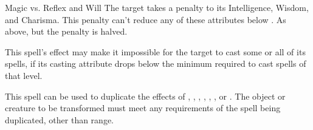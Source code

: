 \begin{spellheader}
    \begin{spelltargetinginfo}
    \end{spelltargetinginfo}
    \begin{spelleffects}
    \end{spelleffects}
\end{spellheader}
\begin{spellcontent}
    \begin{spellattack}{Magic vs. Reflex and Will}
        \spellsuccess[Reflex] The target takes a  penalty to its Intelligence, Wisdom, and Charisma. This penalty can't reduce any of these attributes below .
        \spellfailure[Will] As above, but the penalty is halved.
    \end{spellattack}
    \spelldur{\durshort}
\end{spellcontent}
\begin{spellfooter}
    \spellnotes This spell's effect may make it impossible for the target to cast some or all of its spells, if its casting attribute drops below the minimum required to cast spells of that level.
\end{spellfooter}

\begin{spellheader}
    \spellrng{\rngmed}
\end{spellheader}
\begin{spellcontent}
    \spellspecial This spell can be used to duplicate the effects of , , , , , , or . The object or creature to be transformed must meet any requirements of the spell being duplicated, other than range.
\end{spellcontent}
\begin{spellfooter}

\end{spellfooter}

